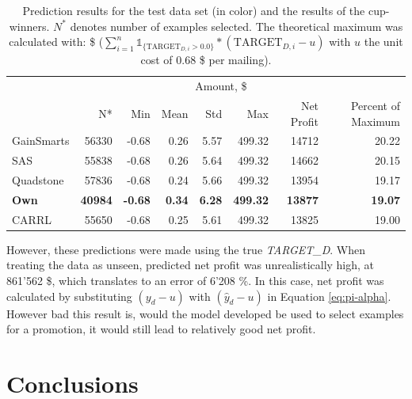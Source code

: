 \documentclass[
  11pt,
  a4paper,
  DIV=12,captions=tableheading,oneside,titlepage]{scrbook}
\begin{document}
\begin{table}[!h]

\caption{\label{tab:prediction-results}Prediction results for the test data set (in color) and the results of the cup-winners. \(N^*\) denotes number of examples selected. The theoretical maximum was calculated with: \$ (\(\sum_{i=1}^n \mathbb{1}_{\{\text{TARGET}_{D,i} > 0.0\}}*(\text{TARGET}_{D,i} - u)\) with \(u\) the unit cost of 0.68 \$ per mailing).}
\centering
\begin{tabular}{lrrrrrrr}
\toprule
\multicolumn{1}{c}{ } & \multicolumn{1}{c}{ } & \multicolumn{5}{c}{Amount, \$} & \multicolumn{1}{c}{ } \\
\cmidrule(l{3pt}r{3pt}){3-7}
  & N* & Min & Mean & Std & Max & Net Profit & Percent of Maximum\\
\midrule
GainSmarts & 56330 & -0.68 & 0.26 & 5.57 & 499.32 & 14712 & 20.22\\
SAS & 55838 & -0.68 & 0.26 & 5.64 & 499.32 & 14662 & 20.15\\
Quadstone & 57836 & -0.68 & 0.24 & 5.66 & 499.32 & 13954 & 19.17\\
\textcolor[HTML]{39a8d1}{\textbf{Own}} & \textcolor[HTML]{39a8d1}{\textbf{40984}} & \textcolor[HTML]{39a8d1}{\textbf{-0.68}} & \textcolor[HTML]{39a8d1}{\textbf{0.34}} & \textcolor[HTML]{39a8d1}{\textbf{6.28}} & \textcolor[HTML]{39a8d1}{\textbf{499.32}} & \textcolor[HTML]{39a8d1}{\textbf{13877}} & \textcolor[HTML]{39a8d1}{\textbf{19.07}}\\
CARRL & 55650 & -0.68 & 0.25 & 5.61 & 499.32 & 13825 & 19.00\\
\bottomrule
\end{tabular}
\end{table}

However, these predictions were made using the true \emph{TARGET\_D}. When treating the data as unseen, predicted net profit was unrealistically high, at 861'562 \$, which translates to an error of 6'208 \%. In this case, net profit was calculated by substituting \((y_d-u)\) with \((\hat{y}_d-u)\) in Equation \eqref{eq:pi-alpha}. However bad this result is, would the model developed be used to select examples for a promotion, it would still lead to relatively good net profit.

\hypertarget{conclusions}{%
\chapter{Conclusions}\label{conclusions}}
\end{document}

